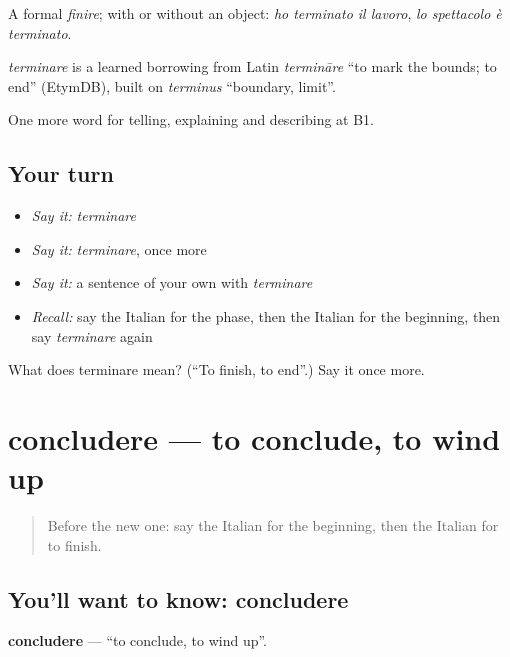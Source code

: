 A formal \emph{finire}; with or without an object: \emph{ho terminato il lavoro}, \emph{lo spettacolo è terminato}.

\begin{cousinweb}
\emph{terminare} is a learned borrowing from Latin \emph{termināre} \textquotedblleft{}to mark the bounds; to end\textquotedblright{} (EtymDB), built on \emph{terminus} \textquotedblleft{}boundary, limit\textquotedblright{}.
\end{cousinweb}

\begin{grammarlens}[title={What you've built}]
One more word for telling, explaining and describing at B1.
\end{grammarlens}

\subsection*{Your turn}
\begin{itemize}
\raggedright
  \item \emph{Say it:} \emph{terminare}
  \item \emph{Say it:} \emph{terminare}, once more
  \item \emph{Say it:} a sentence of your own with \emph{terminare}
  \item \emph{Recall:} say the Italian for the phase, then the Italian for the beginning, then say \emph{terminare} again
\end{itemize}

\begin{tcolorbox}[breakable,colback=teal!4,colframe=teal!35!black,title={Before you move on}]
What does terminare mean? (\textquotedblleft{}To finish, to end\textquotedblright{}.) Say it once more.
\end{tcolorbox}
\section[concludere]{concludere — to conclude, to wind up}

\label{lesson:IT-C278-concludere}



\begin{quote}
Before the new one: say the Italian for the beginning, then the Italian for to finish.
\end{quote}

\subsection*{You'll want to know: concludere}
\textbf{concludere} — \textquotedblleft{}to conclude, to wind up\textquotedblright{}.


